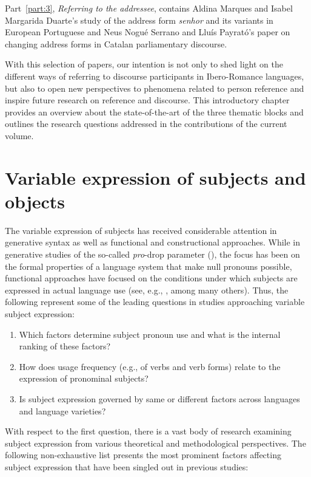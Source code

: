 \documentclass[output=paper]{langscibook}
\begin{document}
Part~\ref{part:3}, \textit{Referring to the addressee},  contains Aldina Marques and Isabel Margarida Duarte’s study of the address form \textit{senhor}  and its variants in European Portuguese and Neus Nogué Serrano and Lluís Payrató’s paper on changing address forms in Catalan parliamentary discourse. 


With this selection of papers, our intention is not only to shed light on the different ways of referring to discourse participants in Ibero-Romance languages, but also to open new perspectives to phenomena related to person reference and inspire future research on reference and discourse. This introductory chapter provides an overview about the state-of-the-art of the three thematic blocks and outlines the research questions addressed in the contributions of the current volume. 


\section{Variable expression of subjects and objects}

The variable expression of subjects has received considerable attention in generative syntax as well as functional and constructional approaches. While in generative studies of the so-called \textit{pro}-drop parameter (\citealt{Chomsky1981,Chomsky1982, Rizzi1982, Solà1992, Barbosa1995}), the focus has been on the formal properties of a language system that make null pronouns possible, functional approaches have focused on the conditions under which subjects are expressed in actual language use (see, e.g., \citealt{Enríquez1984, Bentivoglio1987, Cameron1993, Morales1997, OtheguyEtAl2007, TravisCacoullos2012, Posio2011,Posio2018}, among many others). Thus, the following represent some of the leading questions in studies approaching variable subject expression: 

\begin{enumerate}
    \item Which factors determine subject pronoun use and what is the internal ranking of these factors? 
    \item How does usage frequency (e.g., of verbs and verb forms) relate to the expression of pronominal subjects? 
    \item Is subject expression governed by same or different factors across languages and language varieties? 
\end{enumerate}


With respect to the first question, there is a vast body of research examining subject expression from various theoretical and methodological perspectives. The following non-exhaustive list presents the most prominent factors affecting subject expression that have been singled out in previous studies:
\end{document}

